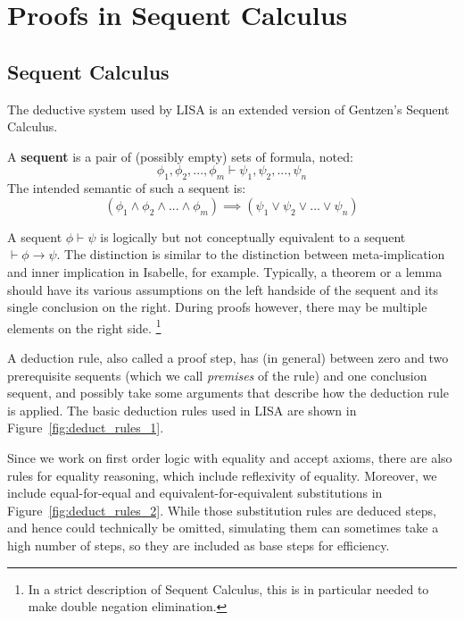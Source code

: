 \section{Proofs in Sequent Calculus}
\label{sect:proofs_lk}
\subsection{Sequent Calculus}
\label{subsec:lk}
The deductive system used by LISA is an extended version of Gentzen's Sequent Calculus.
\begin{defin}
  A \textbf{sequent} is a pair of (possibly empty) sets of formula, noted:
  $$\phi_1, \phi_2, ..., \phi_m \vdash \psi_1, \psi_2, ..., \psi_n$$
  The intended semantic of such a sequent is:
  \begin{equation}
    \label{eq:SequentSemantic}
    (\phi_1 \land \phi_2 \land ... \land \phi_m ) \implies (\psi_1 \lor \psi_2 \lor ... \lor \psi_n )
  \end{equation}

\end{defin}
A sequent $\phi \vdash \psi$ is logically but not conceptually equivalent to a sequent $\vdash \phi \rightarrow \psi$. The distinction is similar to the distinction between meta-implication and inner implication in Isabelle, for example. Typically, a theorem or a lemma should have its various assumptions on the left handside of the sequent and its single conclusion on the right. During proofs however, there may be multiple elements on the right side. \footnote{In a strict description of Sequent Calculus, this is in particular needed to make double negation elimination.}

A deduction rule, also called a proof step, has  (in general) between zero and two prerequisite sequents (which we call \textit{premises} of the rule) and one conclusion sequent, and possibly take some arguments that describe how the deduction rule is applied. The basic deduction rules used in LISA are shown in Figure~\ref{fig:deduct_rules_1}.


Since we work on first order logic with equality and accept axioms, there are also rules for equality reasoning, which include reflexivity of equality. Moreover, we include equal-for-equal and equivalent-for-equivalent substitutions in Figure~\ref{fig:deduct_rules_2}. While those substitution rules are deduced steps, and hence could technically be omitted, simulating them can sometimes take a high number of steps, so they are included as base steps for efficiency.

